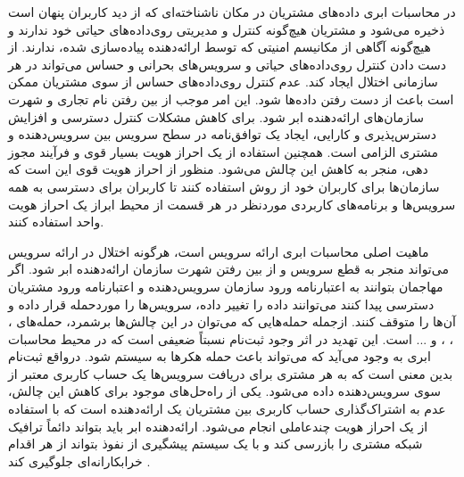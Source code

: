 \documentclass[a4paper,oneside,12pt]{report}
\begin{document}
در محاسبات ابری داده‌های مشتریان در مکان ناشناخته‌ای که از دید کاربران پنهان است ذخیره می‌شود و مشتریان هیچ‌گونه کنترل و مدیریتی روی‌داده‌های حیاتی خود ندارند و هیچ‌گونه آگاهی از مکانیسم امنیتی که توسط ارائه‌دهنده پیاده‌سازی شده، ندارند. از دست دادن کنترل روی‌داده‌های حیاتی و سرویس‌های بحرانی و حساس می‌تواند در هر سازمانی اختلال ایجاد کند. عدم کنترل روی‌داده‌های حساس از سوی مشتریان ممکن است باعث از دست رفتن داده‌ها شود. این امر موجب از بین رفتن نام تجاری و شهرت سازمان‌های ارائه‌دهنده ابر شود. برای کاهش مشکلات کنترل دسترسی و افزایش دسترس‌پذیری و کارایی، ایجاد یک توافق‌نامه در سطح سرویس بین سرویس‌دهنده و مشتری الزامی است. همچنین استفاده از یک احراز هویت بسیار قوی و فرآیند مجوز دهی، منجر به کاهش این چالش می‌شود. منظور از احراز هویت قوی این است که سازمان‌ها برای کاربران خود از روش 
استفاده کنند تا کاربران برای دسترسی به همه سرویس‌ها و برنامه‌های کاربردی موردنظر در هر قسمت از محیط ابراز یک احراز هویت واحد استفاده کنند.

ماهیت اصلی محاسبات ابری ارائه سرویس است، هرگونه اختلال در ارائه سرویس می‌تواند منجر به قطع سرویس و از بین رفتن شهرت سازمان ارائه‌دهنده ابر شود. اگر مهاجمان بتوانند به اعتبارنامه ورود سازمان سرویس‌دهنده و اعتبارنامه ورود مشتریان دسترسی پیدا کنند می‌توانند داده را تغییر داده، سرویس‌ها را موردحمله قرار داده و آن‌ها را متوقف کنند. ازجمله حمله‌هایی که می‌توان در این چالش‌ها برشمرد، حمله‌های 
، 
، 
، 
و ... است. این تهدید در اثر وجود ثبت‌نام نسبتاً ضعیفی است که در محیط محاسبات ابری به وجود می‌آید که می‌تواند باعث حمله هکرها به سیستم شود. درواقع ثبت‌نام بدین معنی است که به هر مشتری برای دریافت سرویس‌ها یک حساب کاربری معتبر از سوی سرویس‌دهنده داده می‌شود. یکی از راه‌حل‌های موجود برای کاهش این چالش، عدم به اشتراک‌گذاری حساب کاربری بین مشتریان ‌یک ارائه‌دهنده است که با استفاده از یک احراز هویت چندعاملی انجام می‌شود. ارائه‌دهنده ابر باید بتواند دائماً ترافیک شبکه مشتری را بازرسی کند و با یک سیستم پیشگیری از نفوذ بتواند از هر اقدام خرابکارانه‌ای جلوگیری کند
\cite{6}.
\end{document}
